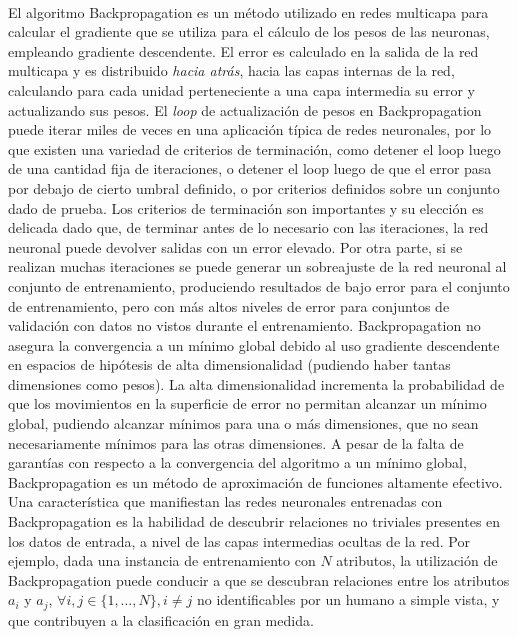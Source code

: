 \paragraph{}El algoritmo Backpropagation es un método utilizado en redes multicapa para calcular el gradiente que se utiliza para el cálculo de los pesos de las neuronas, empleando gradiente descendente.
El error es calculado en la salida de la red multicapa y es distribuido \textit{hacia atrás}, hacia las capas internas de la red, calculando para cada unidad perteneciente a una capa intermedia su error y actualizando sus pesos.
El \textit{loop} de actualización de pesos en Backpropagation puede iterar miles de veces en una aplicación típica de redes neuronales, por lo que existen una variedad de criterios de terminación, como detener el loop luego de una cantidad fija de iteraciones, o detener el loop luego de que el error pasa por debajo de cierto umbral definido, o por criterios definidos sobre un conjunto dado de prueba. 
Los criterios de terminación son importantes y su elección es delicada dado que, de terminar antes de lo necesario con las iteraciones, la red neuronal puede devolver salidas con un error elevado.
Por otra parte, si se realizan muchas iteraciones se puede generar un sobreajuste de la red neuronal al conjunto de entrenamiento, produciendo resultados de bajo error para el conjunto de entrenamiento, pero con más altos niveles de error para conjuntos de validación con datos no vistos durante el entrenamiento.
Backpropagation no asegura la convergencia a un mínimo global debido al uso gradiente descendente en espacios de hipótesis de alta dimensionalidad (pudiendo haber tantas dimensiones como pesos).
La alta dimensionalidad incrementa la probabilidad de que los movimientos en la superficie de error no permitan alcanzar un mínimo global, pudiendo alcanzar mínimos para una o más dimensiones, que no sean necesariamente mínimos para las otras dimensiones.
A pesar de la falta de garantías con respecto a la convergencia del algoritmo a un mínimo global, Backpropagation es un método de aproximación de funciones altamente efectivo.
Una característica que manifiestan las redes neuronales entrenadas con Backpropagation es la habilidad de descubrir relaciones no triviales presentes en los datos de entrada, a nivel de las capas intermedias ocultas de la red.
Por ejemplo, dada una instancia de entrenamiento con $N$ atributos, la utilización de Backpropagation puede conducir a que se descubran relaciones entre los atributos $a_i$ y $a_j$,  $\forall i, j \in \{1, \dots, N\}, i \neq j$ no identificables por un humano a simple vista, y que contribuyen a la clasificación en gran medida.

